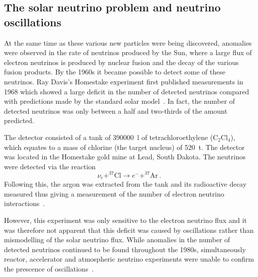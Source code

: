 \subsection{The solar neutrino problem and neutrino oscillations}
\label{sec:theory:history:oscillations}

At the same time as these various new particles were being discovered, anomalies were observed in the rate of neutrinos produced by the Sun, where a large flux of electron neutrinos is produced by nuclear fusion and the decay of the various fusion products. 
By the 1960s it became possible to detect some of these neutrinos.
Ray Davis's Homestake experiment first published measurements in 1968 which showed a large deficit in the number of detected neutrinos compared with predictions made by the standard solar model~\cite{SSM}.
In fact, the number of detected neutrinos was only between a half and two-thirds of the amount predicted.

The detector consisted of a tank of \SI{390000}{\litre} of tetrachloroethylene ($\text{C}_{2}\text{Cl}_{4}$), which equates to a mass of chlorine (the target nucleus) of \SI{520}{\tonne}.
The detector was located in the Homestake gold mine at Lead, South Dakota.
The neutrinos were detected via the reaction
\begin{equation}
  \nu_{e} + ^{37}\text{Cl} \rightarrow e^{-} + ^{37}\text{Ar} \, .
\end{equation}
Following this, the argon was extracted from the tank and its radioactive decay measured thus giving a measurement of the number of electron neutrino interactions~\cite{rayDavis}.

However, this experiment was only sensitive to the electron neutrino flux and it was therefore not apparent that this deficit was caused by oscillations rather than mismodelling of the solar neutrino flux.
While anomalies in the number of detected neutrinos continued to be found throughout the 1980s, simultaneously reactor, accelerator and atmospheric neutrino experiments were unable to confirm the prescence of oscillations~\cite{neutrinoHistory}.

